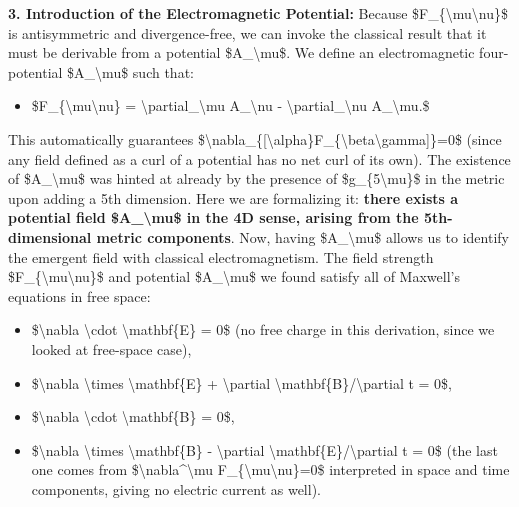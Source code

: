 \textbf{3. Introduction of the Electromagnetic Potential:} Because
\$F\_\{\textbackslash{}mu\textbackslash{}nu\}\$ is antisymmetric and
divergence-free, we can invoke the classical result that it must be
derivable from a potential \$A\_\textbackslash{}mu\$. We define an
electromagnetic four-potential \$A\_\textbackslash{}mu\$ such that:

\begin{itemize}
\item
  \$F\_\{\textbackslash{}mu\textbackslash{}nu\} =
  \textbackslash{}partial\_\textbackslash{}mu A\_\textbackslash{}nu -
  \textbackslash{}partial\_\textbackslash{}nu A\_\textbackslash{}mu.\$
\end{itemize}

This automatically guarantees
\$\textbackslash{}nabla\_\{{[}\textbackslash{}alpha\}F\_\{\textbackslash{}beta\textbackslash{}gamma{]}\}=0\$
(since any field defined as a curl of a potential has no net curl of its
own). The existence of \$A\_\textbackslash{}mu\$ was hinted at already
by the presence of \$g\_\{5\textbackslash{}mu\}\$ in the metric upon
adding a 5th dimension. Here we are formalizing it: \textbf{there exists
a potential field \$A\_\textbackslash{}mu\$ in the 4D sense, arising
from the 5th-dimensional metric components}​. Now, having
\$A\_\textbackslash{}mu\$ allows us to identify the emergent field with
classical electromagnetism. The field strength
\$F\_\{\textbackslash{}mu\textbackslash{}nu\}\$ and potential
\$A\_\textbackslash{}mu\$ we found satisfy all of Maxwell's equations in
free space:

\begin{itemize}
\item
  \$\textbackslash{}nabla \textbackslash{}cdot
  \textbackslash{}mathbf\{E\} = 0\$ (no free charge in this derivation,
  since we looked at free-space case),
\item
  \$\textbackslash{}nabla \textbackslash{}times
  \textbackslash{}mathbf\{E\} + \textbackslash{}partial
  \textbackslash{}mathbf\{B\}/\textbackslash{}partial t = 0\$,
\item
  \$\textbackslash{}nabla \textbackslash{}cdot
  \textbackslash{}mathbf\{B\} = 0\$,
\item
  \$\textbackslash{}nabla \textbackslash{}times
  \textbackslash{}mathbf\{B\} - \textbackslash{}partial
  \textbackslash{}mathbf\{E\}/\textbackslash{}partial t = 0\$ (the last
  one comes from \$\textbackslash{}nabla\^{}\textbackslash{}mu
  F\_\{\textbackslash{}mu\textbackslash{}nu\}=0\$ interpreted in space
  and time components, giving no electric current as well).
\end{itemize}

